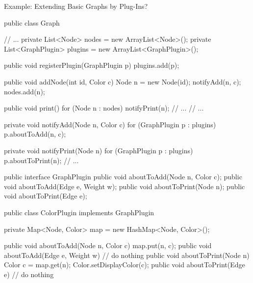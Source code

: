\begin{frame}[fragile]{Example: Extending Basic Graphs by Plug-Ins?}
	\tiny\begin{mycolumns}[columns=2,widths={50,50}]
\begin{codetight}{}
public class Graph {
	// ...
	private List<Node> nodes = new ArrayList<Node>();	
	private List<GraphPlugin> plugins = new ArrayList<GraphPlugin>();
	
	public void registerPlugin(GraphPlugin p){
		plugins.add(p);
	}
	
	public void addNode(int id, Color c){
		Node n = new Node(id);
		notifyAdd(n, c);
		nodes.add(n);
	}
	
	public void print() {
		for (Node n : nodes) {
			notifyPrint(n);
			// ...
		}
		// ...
	}
	
	private void notifyAdd(Node n, Color c) {
		for (GraphPlugin p : plugins) {
			p.aboutToAdd(n, c);
		}
	}
	
	private void notifyPrint(Node n) {
		for (GraphPlugin p : plugins) {
			p.aboutToPrint(n);
		}
	}
	// ...
}
\end{codetight}
		\mynextcolumn
\begin{codetight}{}
public interface GraphPlugin {
	public void aboutToAdd(Node n, Color c);
	public void aboutToAdd(Edge e, Weight w);
	public void aboutToPrint(Node n);
	public void aboutToPrint(Edge e);
}
\end{codetight}
\begin{codetight}{}
public class ColorPlugin implements GraphPlugin {
	private Map<Node, Color> map = new HashMap<Node, Color>();

	public void aboutToAdd(Node n, Color c) {
		map.put(n, c);
	}
	public void aboutToAdd(Edge e, Weight w) {
		// do nothing
	}
	public void aboutToPrint(Node n) {
		Color c = map.get(n);
		Color.setDisplayColor(c);
	}
	public void aboutToPrint(Edge e) {
		// do nothing
	}
}
\end{codetight}
	\end{mycolumns}
\end{frame}

